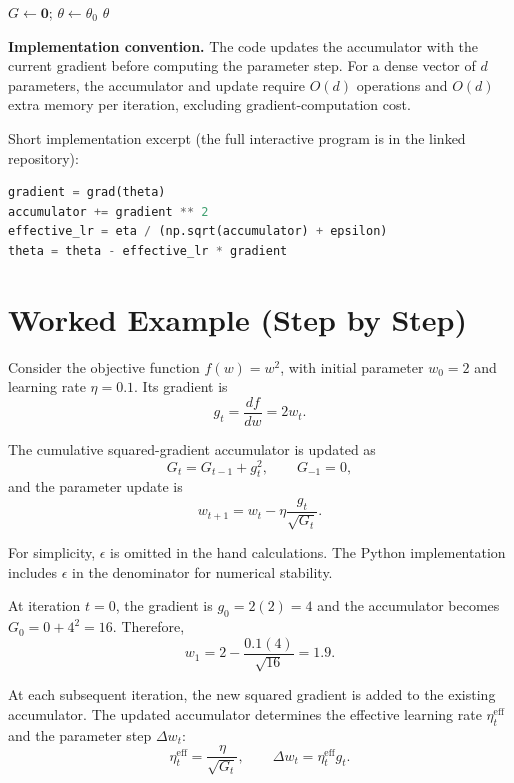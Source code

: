 \documentclass[11pt,a4paper]{article}
\begin{document}
\begin{algorithm}[h]
\caption{AdaGrad for minimizing a differentiable objective}
$G \leftarrow \mathbf{0}$; $\theta \leftarrow \theta_0$\;
\Return $\theta$\;
\end{algorithm}

\textbf{Implementation convention.} The code updates the accumulator with the
current gradient before computing the parameter step. For a dense vector of
$d$ parameters, the accumulator and update require $O(d)$ operations and
$O(d)$ extra memory per iteration, excluding gradient-computation cost.

Short implementation excerpt (the full interactive program is in the linked repository):
\begin{lstlisting}[language=Python]
gradient = grad(theta)
accumulator += gradient ** 2
effective_lr = eta / (np.sqrt(accumulator) + epsilon)
theta = theta - effective_lr * gradient
\end{lstlisting}

\section{Worked Example (Step by Step)}

Consider the objective function $f(w)=w^2$, with initial parameter
$w_0=2$ and learning rate $\eta=0.1$. Its gradient is
\[
g_t = \frac{df}{dw}=2w_t.
\]

The cumulative squared-gradient accumulator is updated as
\[
G_t = G_{t-1}+g_t^2,\qquad G_{-1}=0,
\]
and the parameter update is
\[
w_{t+1}=w_t-\eta\frac{g_t}{\sqrt{G_t}}.
\]

For simplicity, $\epsilon$ is omitted in the hand calculations.
The Python implementation includes $\epsilon$ in the denominator
for numerical stability.

At iteration $t=0$, the gradient is $g_0=2(2)=4$ and the
accumulator becomes $G_0=0+4^2=16$. Therefore,
\[
w_1=2-\frac{0.1(4)}{\sqrt{16}}=1.9.
\]

At each subsequent iteration, the new squared gradient is added
to the existing accumulator. The updated accumulator determines
the effective learning rate $\eta_t^{\mathrm{eff}}$ and the
parameter step $\Delta w_t$:
\[
\eta_t^{\mathrm{eff}}=\frac{\eta}{\sqrt{G_t}},
\qquad
\Delta w_t=\eta_t^{\mathrm{eff}}g_t.
\]
\end{document}
